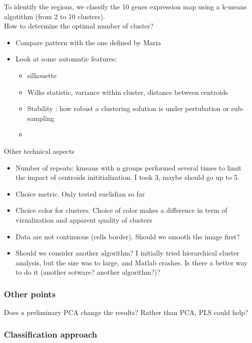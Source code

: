 \documentclass[]{article}
\begin{document}
To identify the regions, we classify the 10 genes expression map using a k-means algotithm (from 2 to 10 clusters). \\
How to determine the optimal number of cluster?
\begin{itemize}
	\item Compare pattern with the one defined by Maria
	\item Look at some automatic features:
		\begin{itemize}
			\item silhouette
			\item Wilks statistic, variance within cluster, distance between centroids
			\item Stability : how robust a clustering solution is under pertubation or sub-sampling
			\item 
		\end{itemize} 
\end{itemize} 
Other technical aspects
	\begin{itemize}
		\item Number of repeats: kmeans with n groups performed several times to limit the impact of centroids inititialization. I took 3, maybe should go up to 5.
		\item Choice metric. Only tested euclidian so far
		\item Choice color for clusters. Choice of color makes a difference in term of vizualization and apparent quality of clusters 
	\end{itemize}
\begin{itemize}
\item Data are not continuous (cells border). Should we smooth the image first?
\item Should we consider another algorithm? I initially tried hierarchical cluster analysis, but the size was to large, and Matlab crashes. Is there a better way to do it (another sotware? another algorithm?)?
\end{itemize} 
\subsubsection{Other points}
{\color{blue} Does a preliminary PCA change the results?
Rather than PCA, PLS could help?}\\

\subsubsection{Classification approach}
\end{document}
